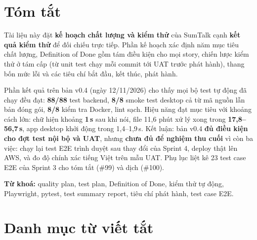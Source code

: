\documentclass[12pt,a4paper]{report}
\begin{document}
\tableofcontents

\chapter*{Tóm tắt}

Tài liệu này đặt \textbf{kế hoạch chất lượng và kiểm thử} của SumTalk cạnh \textbf{kết quả kiểm thử} để đối
chiếu trực tiếp. Phần kế hoạch xác định năm mục tiêu chất lượng, Definition of Done gồm tám điều kiện cho mọi
story, chiến lược kiểm thử ở tám cấp (từ unit test chạy mỗi commit tới UAT trước phát hành), thang bốn mức lỗi
và các tiêu chí bắt đầu, kết thúc, phát hành.

Phần kết quả trên bản v0.4 (ngày 12/11/2026) cho thấy mọi bộ test tự động đã chạy đều đạt: \textbf{88/88} test
backend, \textbf{8/8} smoke test desktop cả từ mã nguồn lẫn bản đóng gói, \textbf{8/8} kiểm tra Docker, lint
sạch. Hiệu năng đạt mục tiêu với khoảng cách lớn: chữ hiện khoảng \textbf{1\,s} sau khi nói, file 11,6 phút xử
lý xong trong \textbf{17,8--56,7\,s}, app desktop khởi động trong 1,4--1,9\,s. Kết luận: bản v0.4 \textbf{đủ
điều kiện cho đợt test nội bộ và UAT}, nhưng \textbf{chưa đủ để nghiệm thu cuối} vì còn ba việc: chạy lại test
E2E trình duyệt sau thay đổi của Sprint 4, deploy thật lên AWS, và đo độ chính xác tiếng Việt trên mẫu UAT.
Phụ lục liệt kê 23 test case E2E của Sprint 3 cho tóm tắt (\#99) và dịch (\#100).

\textbf{Từ khoá:} quality plan, test plan, Definition of Done, kiểm thử tự động, Playwright, pytest, test summary
report, tiêu chí phát hành, test case E2E.

\chapter*{Danh mục từ viết tắt}
\end{document}
